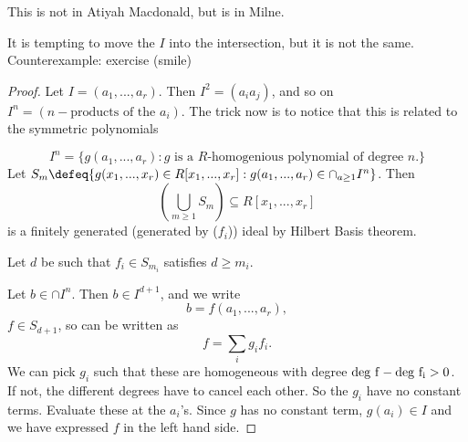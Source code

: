 \begin{remark}
    This is not in Atiyah Macdonald, but is in Milne.

    It is tempting to move the $I$ into the intersection, but it is not the same. 
    Counterexample: exercise (smile)
\end{remark}
\begin{proof}
    Let $I=(a_1,...,a_r)$. Then $I^2=(a_ia_j)$, and so on $I^n=(n-\textrm{products of the }a_i)$. The trick now is to notice that this is related to the symmetric polynomials

    \[
    I^n = \{g(a_1,...,a_r): g \textrm{ is a $R$-homogenious polynomial of degree $n$}.\}
    \]
    Let $S_m\defeq \{g(x_1,...,x_r)\in R[x_1,...,x_r]: g(a_1,...,a_r)\in \cap_{a\geq 1} I^n\}$.
    Then \[
    (\bigcup_{m\geq 1}S_m)\subseteq R[x_1,...,x_r]
    \]
    is a finitely generated (generated by ($f_i$)) ideal by Hilbert Basis theorem.

    Let $d$ be such that $f_i\in S_{m_i}$ satisfies $d\geq m_i$.

    Let $b\in \cap I^n$. Then $b\in I^{d+1}$, and we write \[
    b=f(a_1,...,a_r),
    \]
    $f\in S_{d+1}$, so can be written as \[
    f=\sum_i g_i f_i.
    \] 
    We can pick $g_i$ such that these are homogeneous with degree $\rm{deg}\ f-\rm{deg}\  f_i> 0$. If not, the different degrees have to cancel each other. So the $g_i$ have no constant terms. 
    Evaluate these at the $a_i$'s. Since $g$ has no constant term, $g(a_i)\in I$ and we have expressed $f$ in the left hand side.
\end{proof}
